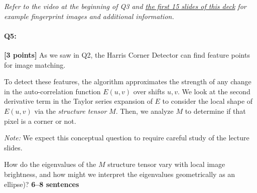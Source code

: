 \documentclass[11pt]{article}
\begin{document}
\begin{enumerate}[(a)]
\begin{tcolorbox}[colback=orange!5!white,colframe=orange!75!black]
    \emph{Refer to the video at the beginning of Q3 and \href{http://biometrics.cse.msu.edu/Presentations/AnilJain_UniquenessOfFingerprints_NAS05.pdf}{the first 15 slides of this deck} for example fingerprint images and additional information.}
    \end{tcolorbox}


\end{enumerate}

\pagebreak




\pagebreak
\paragraph{Q5:} \textbf{[3 points]}
As we saw in Q2, the Harris Corner Detector can find feature points for image matching.

To detect these features, the algorithm approximates the strength of any change in the auto-correlation function $E(u, v)$ over shifts $u,v$. We look at the second derivative term in the Taylor series expansion of $E$ to consider the local shape of $E(u, v)$ via the \emph{structure tensor} $M$. Then, we analyze $M$ to determine if that pixel is a corner or not.

\textit{Note:} We expect this conceptual question to require careful study of the lecture slides.

\begin{tcolorbox}[colback=orange!5!white,colframe=orange!75!black]
How do the eigenvalues of the $M$ structure tensor vary with local image brightness, and how might we interpret the eigenvalues geometrically as an ellipse)? \textbf{6--8 sentences}
\end{tcolorbox}

\end{document}
